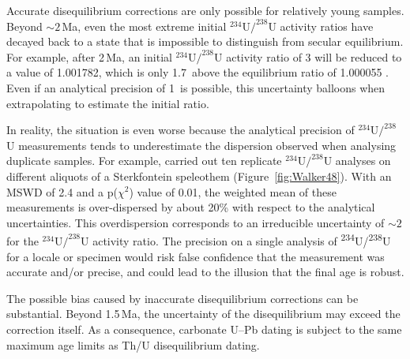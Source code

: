 \documentclass[11pt]{article}
\begin{document}
Accurate disequilibrium corrections are only possible for relatively
young samples. Beyond $\sim{2}\,$Ma, even the most extreme initial
${}^{234}$U${/}^{238}$U activity ratios have decayed back to a state
that is impossible to distinguish from secular equilibrium.  For
example, after 2\,Ma, an initial ${}^{234}$U${/}^{238}$U activity
ratio of 3 will be reduced to a value of 1.001782, which is only
1.7\,\permil{} above the equilibrium ratio of 1.000055
\citep[$\equiv{\lambda_{234}/[\lambda_{234}-\lambda_{238}]}$,][]{mclean2016b}. Even
if an analytical precision of 1\,\permil{} is possible, this
uncertainty balloons when extrapolating to estimate the initial ratio.

In reality, the situation is even worse because the analytical
precision of ${}^{234}$U${/}^{238}$U measurements tends to
underestimate the dispersion observed when analysing duplicate
samples. For example, \citet{walker2006} carried out ten replicate
${}^{234}$U${/}^{238}$U analyses on different aliquots of a
Sterkfontein speleothem (Figure~\ref{fig:Walker48}). With an MSWD of
2.4 and a p($\chi^2$) value of 0.01, the weighted mean of these
measurements is over-dispersed by about 20\% with respect to the
analytical uncertainties. This overdispersion corresponds to an
irreducible uncertainty of $\sim{2}$\permil{} for the
${}^{234}$U${/}^{238}$U activity ratio. The precision on a single
analysis of \textsuperscript{234}U/\textsuperscript{238}U for a locale
or specimen would risk false confidence that the measurement was
accurate and/or precise, and could lead to the illusion that the final
age is robust.

The possible bias caused by inaccurate disequilibrium corrections can
be substantial. Beyond 1.5\,Ma, the uncertainty of the disequilibrium
may exceed the correction itself. As a consequence, carbonate U--Pb
dating is subject to the same maximum age limits as Th/U
disequilibrium dating.\medskip
\end{document}
